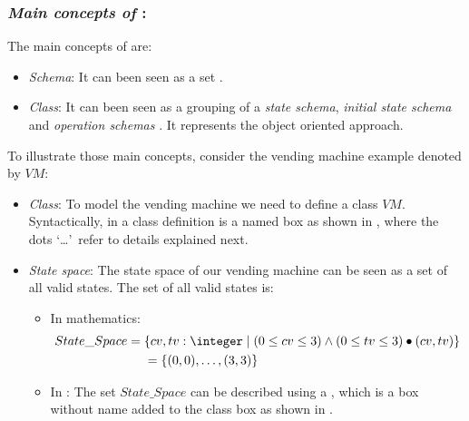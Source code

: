 \subsubsection{\textit{Main concepts of \oz{}}:} 
\label{main_concepts_oz} 
The main concepts of \oz{} are:
\begin{itemize}
\item \textit{Schema}: It can been seen as a set \cite{woodcock}.
\item \textit{Class}: It can been seen as a grouping of a \textit{state schema}, \textit{initial state schema} and \textit{operation schemas} \cite{kenji}. It represents the object oriented approach.
\end{itemize}
To illustrate those main concepts, consider the vending machine example denoted by $VM$:
\begin{itemize}
\item \textit{Class}: To model the vending machine we need to define a class $VM$. Syntactically, in \oz{}
a class definition is a named box as shown in , where the dots \textquoteleft\dots\textquoteright\ refer to details explained next.


\item \textit{State space}: The state space of our vending machine can be seen as a set of all valid states. The set of all valid states is:
\begin{itemize}
\item In mathematics:
\begin{equation*}
\begin{aligned}
State\_Space ={} & \{cv,tv: \integer\mid (0 \leq  cv \leq 3) \wedge
(0 \leq  tv \leq 3)\bullet(cv,tv)\}\\
      & =\{\pair{0}{0},\dots,\pair{3}{3}\}
\end{aligned}
\end{equation*}
\item In \oz{}: The set $State\_Space$ can be described using a , which is a box without name added to the class box as shown in .
\end{itemize}



\end{itemize}
